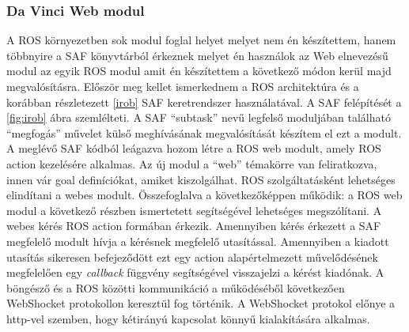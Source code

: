 \documentclass[12pt,a4paper,oneside]{report} %
\begin{document}
\subsubsection{Da Vinci Web modul}
A ROS környezetben sok modul foglal helyet melyet nem én készítettem, hanem többnyire a SAF könyvtárból érkeznek melyet én használok az Web elnevezésű modul az egyik ROS modul amit én készítettem a következő módon kerül majd megvalósításra. 
Először meg kellet ismerkednem a ROS architektúra és a korábban részletezett \ref{irob} SAF keretrendszer használatával.
A SAF felépítését a \ref{fig:irob} ábra szemlélteti. A SAF ``subtask'' nevű legfelső moduljában található ``megfogás'' művelet külső meghívásának megvalósítását készítem el ezt a modult. A meglévő SAF kódból leágazva hozom létre a ROS web modult, amely ROS action kezelésére alkalmas. Az új modul a ``web'' témakörre van feliratkozva, innen vár goal definíciókat, amiket kiszolgálhat. ROS szolgáltatásként lehetséges elindítani a webes modult. Összefoglalva a következőképpen működik: a ROS web modul a következő részben ismertetett  segítségével lehetséges megszólítani. A webes kérés ROS action formában érkezik. Amennyiben kérés érkezett a SAF  megfelelő modult hívja a kérésnek megfelelő utasítással. Amennyiben a kiadott utasítás sikeresen befejeződött ezt egy action alapértelmezett művelődésének megfelelően egy \textit{callback} függvény segítségével visszajelzi a kérést kiadónak. A böngésző és a  ROS közötti kommunikáció a  működéséből következően WebShocket protokollon keresztül fog történik. A WebShocket protokol előnye a http-vel szemben, hogy kétirányú kapcsolat könnyű kialakítására alkalmas.
\end{document}
